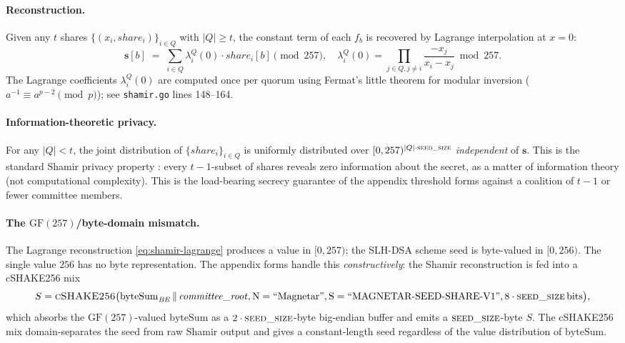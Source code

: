 \paragraph{Reconstruction.} Given any $t$ shares
$\{(x_i, \mathit{share}_i)\}_{i \in Q}$ with $|Q| \ge t$, the
constant term of each $f_b$ is recovered by Lagrange interpolation at
$x = 0$:
\begin{equation}
  \mathbf{s}[b] \;=\; \sum_{i \in Q} \lambda_i^Q(0) \cdot \mathit{share}_i[b]
  \pmod{257},
  \quad
  \lambda_i^Q(0) = \prod_{j \in Q, j \neq i}
    \frac{-x_j}{x_i - x_j} \bmod 257.
  \label{eq:shamir-lagrange}
\end{equation}
The Lagrange coefficients $\lambda_i^Q(0)$ are computed once per quorum
using Fermat's little theorem for modular inversion
($a^{-1} \equiv a^{p-2} \pmod p$); see \texttt{shamir.go} lines 148--164.

\paragraph{Information-theoretic privacy.} For any $|Q| < t$, the joint
distribution of $\{\mathit{share}_i\}_{i \in Q}$ is uniformly distributed
over $[0,257)^{|Q| \cdot \textsc{seed\_size}}$ \emph{independent} of
$\mathbf{s}$. This is the standard Shamir privacy property
\cite{shamir1979,katzlindell}: every $t-1$-subset of shares reveals
zero information about the secret, as a matter of information theory
(not computational complexity). This is the load-bearing secrecy
guarantee of the appendix threshold forms against a coalition of
$t-1$ or fewer committee members.

\paragraph{The $\mathrm{GF}(257)$/byte-domain mismatch.} The Lagrange
reconstruction \eqref{eq:shamir-lagrange} produces a value in
$[0, 257)$; the SLH-DSA scheme seed is byte-valued in $[0, 256)$. The
single value $256$ has no byte representation. The appendix forms
handle this \emph{constructively}: the Shamir reconstruction is fed
into a cSHAKE256 mix
\begin{equation}
  S = \textsc{cSHAKE256}\bigl(
    \mathrm{byteSum}_\mathit{BE} \,\Vert\, \mathit{committee\_root},
    \mathrm{N}=\text{``Magnetar''},
    \mathrm{S}=\text{``MAGNETAR-SEED-SHARE-V1''},
    8 \cdot \textsc{seed\_size}\,\mathrm{bits}\bigr),
  \label{eq:seed-mix}
\end{equation}
which absorbs the $\mathrm{GF}(257)$-valued $\mathrm{byteSum}$ as a
$2 \cdot \textsc{seed\_size}$-byte big-endian buffer and emits a
$\textsc{seed\_size}$-byte $S$. The cSHAKE256 mix domain-separates
the seed from raw Shamir output and gives a constant-length seed
regardless of the value distribution of $\mathrm{byteSum}$.

